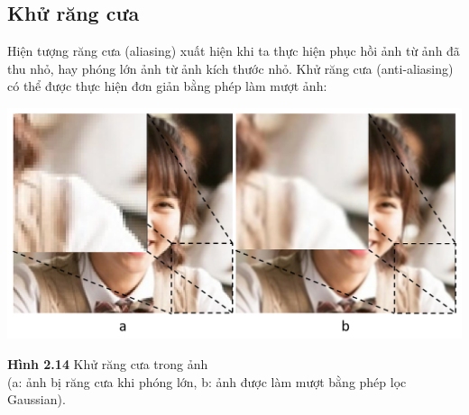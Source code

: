 \subsection{Khử răng cưa}
Hiện tượng răng cưa (aliasing) xuất hiện khi ta thực hiện phục hồi ảnh từ ảnh đã thu nhỏ, hay phóng lớn ảnh từ ảnh kích thước nhỏ. Khử răng cưa (anti-aliasing) có thể được thực hiện đơn giản bằng phép làm mượt ảnh:
\begin{center}
    \includegraphics[scale=0.5]{Figures/fig16.png}
    \par \textbf {Hình 2.14} Khử răng cưa trong ảnh \\(a: ảnh bị răng cưa khi phóng lớn, b: ảnh được làm mượt bằng phép lọc Gaussian).
\end{center}